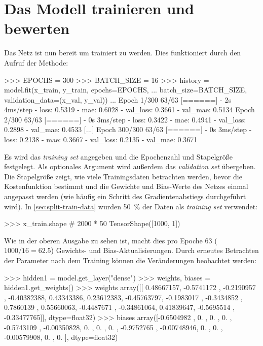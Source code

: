 \section{Das Modell trainieren und bewerten}
\label{sec:train-evaluate-model}
Das Netz ist nun bereit um trainiert zu werden.
Dies funktioniert durch den Aufruf der  Methode:
\begin{pyconcode}
>>> EPOCHS = 300
>>> BATCH_SIZE = 16
>>> history = model.fit(x_train, y_train, epochs=EPOCHS,
...                     batch_size=BATCH_SIZE, validation_data=(x_val, y_val))
...
Epoch 1/300
63/63 [======] - 2s 4ms/step - loss: 0.5319     - mae: 0.6028
                             - val_loss: 0.3661 - val_mae: 0.5134
Epoch 2/300
63/63 [======] - 0s 3ms/step - loss: 0.3422     - mae: 0.4941
                             - val_loss: 0.2898 - val_mae: 0.4533
[...]
Epoch 300/300
63/63 [======] - 0s 3ms/step - loss: 0.2138     - mae: 0.3667
                             - val_loss: 0.2135 - val_mae: 0.3671
\end{pyconcode}
Es wird das \textit{training set} angegeben und die Epochenzahl
und Stapelgröße festgelegt.
Als optionales Argument wird außerdem das \textit{validation set}
übergeben. Die Stapelgröße zeigt, wie viele Trainingsdaten betrachten werden,
bevor die Kostenfunktion bestimmt und die Gewichte und Bias-Werte
des Netzes einmal angepasst werden
(wie häufig ein Schritt des Gradientenabstiegs durchgeführt wird).
In \autoref{sec:split-train-data} wurden \qty{50}{\percent} der Daten
als \textit{training set} verwendet:
\begin{pyconcode}
>>> x_train.shape # 2000 * 50%
TensorShape([1000, 1])
\end{pyconcode}
Wie in der oberen Ausgabe zu sehen ist, macht dies
pro Epoche 63 ($1000 / 16 = \num{62.5}$) Gewichts- und Bias-Aktualisierungen.
Durch erneutes Betrachten der Parameter nach dem Training
können die Veränderungen beobachtet werden:
\begin{pyconcode}
>>> hidden1 = model.get_layer("dense")
>>> weights, biases = hidden1.get_weights()
>>> weights
array([[ 0.48667157, -0.5741172 , -0.2190957 , -0.40382388,  0.43343386,
         0.23612383, -0.45763797, -0.1983017 , -0.3434852 ,  0.7860139 ,
         0.55660063, -0.4487671 , -0.34861064,  0.41839647, -0.5695514 ,
        -0.33477765]], dtype=float32)
>>> biases
array([-0.6504982 ,  0.        ,  0.        ,  0.        , -0.5743109 ,
       -0.00350828,  0.        ,  0.        ,  0.        , -0.9752765 ,
       -0.00748946,  0.        ,  0.        , -0.00579908,  0.        ,
        0.        ], dtype=float32)
\end{pyconcode}
